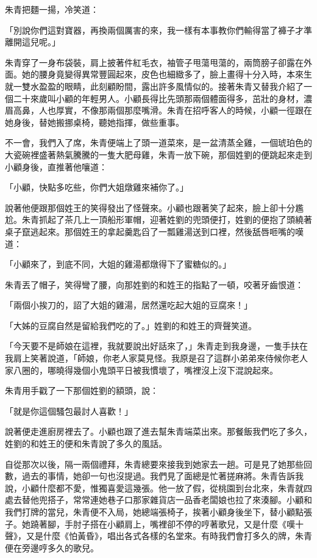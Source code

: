 朱青把麵一揚，冷笑道：

「別說你們這對寶器，再換兩個厲害的來，我一樣有本事教你們輸得當了褲子才準離開這兒呢。」

朱青穿了一身布袋裝，肩上披著件紅毛衣，袖管子甩蕩甩蕩的，兩筒膀子卻露在外面。她的腰身竟變得異常豐圓起來，皮色也細緻多了，臉上畫得十分入時，本來生就一雙水盈盈的眼睛，此刻顧盼間，露出許多風情似的。接著朱青又替我介紹了一個二十來歲叫小顧的年輕男人。小顧長得比先頭那兩個體面得多，茁壯的身材，濃眉高鼻，人也厚實，不像那兩個那麼嘴滑。朱青在招呼客人的時候，小顧一徑跟在她身後，替她搬挪桌椅，聽她指揮，做些重事。

不一會，我們入了席，朱青便端上了頭一道菜來，是一盆清蒸全雞，一個琥珀色的大瓷碗裡盛著熱氣騰騰的一隻大肥母雞，朱青一放下碗，那個姓劉的便跳起來走到小顧身後，直推著他嚷道：

「小顧，快點多吃些，你們大姐燉雞來補你了。」

說著他便跟那個姓王的笑得發出了怪聲來。小顧也跟著笑了起來，臉上卻十分尷尬。朱青抓起了茶几上一頂船形軍帽，迎著姓劉的兜頭便打，姓劉的便抱了頭繞著桌子竄逃起來。那個姓王的拿起羹匙舀了一瓢雞湯送到口裡，然後舐唇咂嘴的嘆道：

「小顧來了，到底不同，大姐的雞湯都燉得下了蜜糖似的。」

朱青丟了帽子，笑得彎了腰，向那姓劉的和姓王的指點了一頓，咬著牙齒恨道：

「兩個小挨刀的，詔了大姐的雞湯，居然還吃起大姐的豆腐來！」

「大姊的豆腐自然是留給我們吃的了。」姓劉的和姓王的齊聲笑道。

「今天要不是師娘在這裡，我就要說出好話來了，」朱青走到我身邊，一隻手扶在我肩上笑著說道，「師娘，你老人家莫見怪。我原是召了這群小弟弟來侍候你老人家八圈的，哪曉得幾個小鬼頭平日被我慣壞了，嘴裡沒上沒下混說起來。

朱青用手戳了一下那個姓劉的額頭，說：

「就是你這個騷包最討人喜歡！」

說著便走進廚房裡去了。小顧也跟了進去幫朱青端菜出來。那餐飯我們吃了多久，姓劉的和姓王的便和朱青說了多久的風話。

自從那次以後，隔一兩個禮拜，朱青總要來接我到她家去一趟。可是見了她那些回數，過去的事情，她卻一句也沒提過。我們見了面總是忙著搓麻將。朱青告訴我說，小顧什麼都不愛，惟獨喜愛這幾張。他一放了假，從桃園到台北來，朱青就四處去替他兜搭子，常常連她巷子口那家雜貨店一品香老闆娘也拉了來湊腳。小顧和我們打牌的當兒，朱青便不入局，她總端張椅子，挨著小顧身後坐下，替小顧點張子。她蹺著腳，手肘子搭在小顧肩上，嘴裡卻不停的哼著歌兒，又是什麼《嘆十聲》，又是什麼《怕黃昏》，唱出各式各樣的名堂來。有時我們會打多久的牌，朱青便在旁邊哼多久的歌兒。

